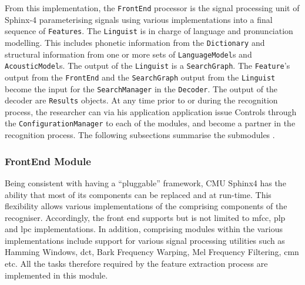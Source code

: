 From this implementation, the \texttt{FrontEnd} processor is the signal processing unit of Sphinx-4 parameterising signals using various implementations into a final sequence of \texttt{Features}.  The \texttt{Linguist} is in charge of language and pronunciation modelling.  This includes phonetic information from the \texttt{Dictionary} and structural information from one or more sets of \texttt{LanguageModel}s and \texttt{AcousticModel}s.  The output of the \texttt{Linguist} is a \texttt{SearchGraph}.  The \texttt{Feature}'s output from the \texttt{FrontEnd} and the \texttt{SearchGraph} output from the \texttt{Linguist} become the input for the \texttt{SearchManager} in the \texttt{Decoder}.  The output of the decoder are \texttt{Results} objects.  At any time prior to or during the recognition process, the researcher can via his application application issue Controls  through the \texttt{ConfigurationManager} to each of the modules, and become a partner in the recognition process.  The following subsections summarise the submodules \citep{walker2004sphinx}.
\subsubsection{FrontEnd Module}
Being consistent with having a ``pluggable'' framework, CMU Sphinx4 has the ability that most of its components can be replaced and at run-time.  This flexibility allows various implementations of the comprising components of the recogniser.  Accordingly, the front end supports but is not limited to \acrfull{mfcc}, \acrfull{plp} and \acrfull{lpc} implementations.  In addition, comprising modules within the various implementations include support for various signal processing utilities such as Hamming Windows, \acrfull{dct}, Bark Frequency Warping, Mel Frequency Filtering, \acrfull{cmn} etc.  All the tasks therefore required by the feature extraction process are implemented in this module.
